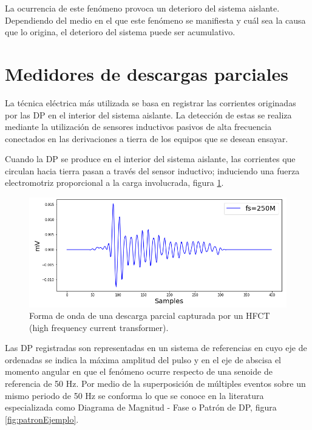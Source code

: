 La ocurrencia de este fenómeno provoca un deterioro del sistema aislante. Dependiendo del medio en el que este fenómeno se manifiesta y cuál sea la causa que lo origina, el deterioro del sistema puede ser acumulativo.

\section{Medidores de descargas parciales}
La técnica eléctrica más utilizada se basa en registrar las corrientes originadas por las DP en el interior del sistema aislante. La detección de estas se realiza mediante la utilización de sensores inductivos pasivos de alta frecuencia conectados en las derivaciones a tierra de los equipos que se desean ensayar.

Cuando la DP se produce en el interior del sistema aislante, las corrientes que circulan hacia tierra pasan a través del sensor inductivo; induciendo una fuerza electromotriz proporcional a la carga involucrada, figura \ref{fig:dpEjemplo}.

\begin{figure}[ht]
	\centering
	\includegraphics[width=\textwidth]{./Figures/dpEjemplo.png}
	\caption{Forma de onda de una descarga parcial capturada por un HFCT (high frequency current transformer).}
	\label{fig:dpEjemplo}
\end{figure}

Las DP registradas son representadas en un sistema de referencias en cuyo eje de ordenadas se indica la máxima amplitud del pulso y en el eje de abscisa el momento angular en que el fenómeno ocurre respecto de una senoide de referencia de 50 Hz. Por medio de la superposición de múltiples eventos sobre un mismo periodo de 50 Hz se conforma lo que se conoce en la literatura especializada como Diagrama de Magnitud - Fase o Patrón de DP, figura \ref{fig:patronEjemplo}.

